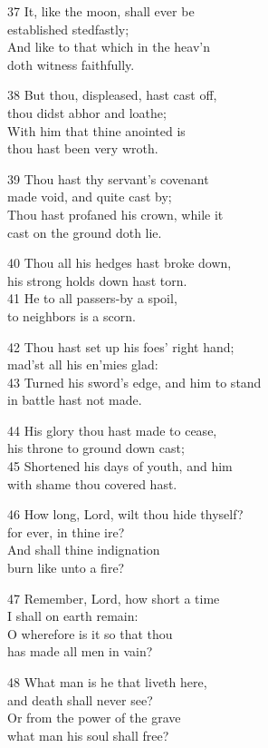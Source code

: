 37 It, like the moon, shall ever be\\
established stedfastly;\\
And like to that which in the heav’n\\
doth witness faithfully.

38 But thou, displeased, hast cast off,\\
thou didst abhor and loathe;\\
With him that thine anointed is\\
thou hast been very wroth.

39 Thou hast thy servant’s covenant\\
made void, and quite cast by;\\
Thou hast profaned his crown, while it\\
cast on the ground doth lie.

40 Thou all his hedges hast broke down,\\
his strong holds down hast torn.\\
41 He to all passers-by a spoil,\\
to neighbors is a scorn.

42 Thou hast set up his foes’ right hand;\\
mad’st all his en’mies glad:\\
43 Turned his sword’s edge, and him to stand\\
in battle hast not made.

44 His glory thou hast made to cease,\\
his throne to ground down cast;\\
45 Shortened his days of youth, and him\\
with shame thou covered hast.

46 How long, Lord, wilt thou hide thyself?\\
for ever, in thine ire?\\
And shall thine indignation\\
burn like unto a fire?

47 Remember, Lord, how short a time\\
I shall on earth remain:\\
O wherefore is it so that thou\\
has made all men in vain?

48 What man is he that liveth here,\\
and death shall never see?\\
Or from the power of the grave\\
what man his soul shall free?

